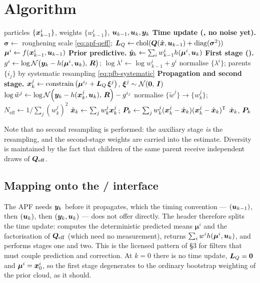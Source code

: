 \section{Algorithm}
\begin{algorithm}[H]
\caption{PF-Auxiliary --- one sampling period}
\begin{algorithmic}[1]
\Require particles $\{\bm{x}_{k-1}^i\}$, weights $\{w_{k-1}^i\}$, $\bm{u}_{k-1},\bm{u}_k,\bm{y}_k$
\State \textbf{Time update (, no noise yet).}
\State $\bm\sigma \gets$ roughening scale \eqref{eq:apf-qeff}; \; $\bm{L}_Q \gets \operatorname{chol}(\bm{Q}(\hat{\bm{x}},\bm{u}_{k-1}) + \operatorname{diag}(\bm\sigma^2))$
 \State $\bm{\mu}^i \gets f(\bm{x}_{k-1}^i, \bm{u}_{k-1})$ \EndFor
\State \textbf{Prior predictive.} $\hat{\bm{y}}_k \gets \sum_i w^i_{k-1} h(\bm{\mu}^i, \bm{u}_k)$
\State \textbf{First stage ().}
 \State $g^i \gets \log \mathcal{N}\!\left(\bm{y}_k - h(\bm{\mu}^i,\bm{u}_k),\,\bm{R}\right)$; \; $\log\lambda^i \gets \log w_{k-1}^i + g^i$ \EndFor
\State normalise $\{\lambda^i\}$; \; parents $\{i_j\}$ by systematic resampling \eqref{eq:pfb-systematic}
\State \textbf{Propagation and second stage.}
  \State $\bm{x}_k^j \gets \operatorname{constrain}\big(\bm{\mu}^{i_j} + \bm{L}_Q\,\bm\xi^j\big)$, \; $\bm\xi^j\sim\mathcal{N}\!\left(\bm 0,\,\bm{I}\right)$
  \State $\log \tilde w^j \gets \log\mathcal{N}\!\left(\bm{y}_k - h(\bm{x}_k^j,\bm{u}_k),\,\bm{R}\right) - g^{i_j}$
\EndFor
\State normalise $\{\tilde w^j\} \to \{w_k^j\}$; \; $N_{\mathrm{eff}} \gets 1/\sum_j (w^j_k)^2$
\State $\hat{\bm{x}}_k \gets \sum_j w_k^j \bm{x}_k^j$; \; $\bm{P}_k \gets \sum_j w_k^j (\bm{x}_k^j - \hat{\bm{x}}_k)(\bm{x}_k^j-\hat{\bm{x}}_k)^{\mathsf{T}}$
\Ensure $\hat{\bm{x}}_k$, $\bm{P}_k$
\end{algorithmic}
\end{algorithm}

\noindent Note that no second resampling is performed: the auxiliary stage \emph{is} the
resampling, and the second-stage weights are carried into the estimate.  Diversity is maintained by
the fact that children of the same parent receive independent draws of $\bm{Q}_{\mathrm{eff}}$.

\subsection*{Mapping onto the / interface}
The APF needs $\bm{y}_k$ before it propagates, which the  timing
convention --- $(\bm{u}_{k-1})$, then $(\bm{u}_k)$, then
$(\bm{y}_k,\bm{u}_k)$ --- does not offer directly.  The header therefore splits the time update:
 computes the deterministic predicted means $\bm{\mu}^i$ and the factorisation of
$\bm{Q}_{\mathrm{eff}}$ (which need no measurement),  returns
$\sum_i w^i h(\bm{\mu}^i,\bm{u}_k)$, and  performs stages one and two.  This is the
licensed pattern of  \S3 for filters that must couple prediction and
correction.  At $k=0$ there is no time update, $\bm{L}_Q = \bm 0$ and $\bm{\mu}^i = \bm{x}_0^i$, so the
first stage degenerates to the ordinary bootstrap weighting of the prior cloud, as it should.

